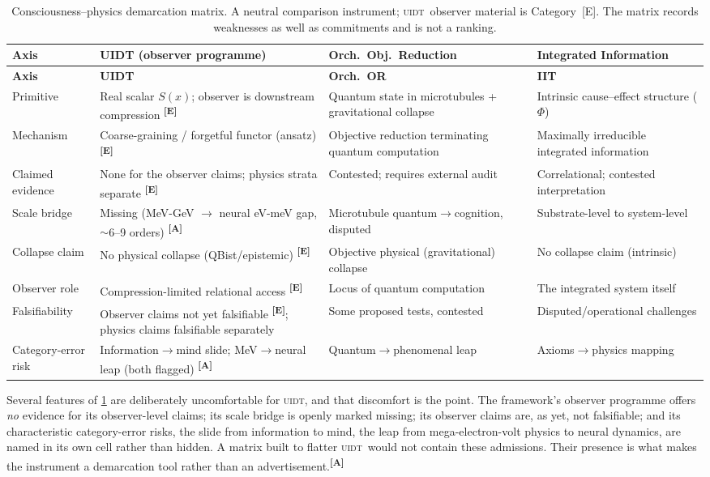 \documentclass[12pt,a4paper,twoside]{article}
\theoremstyle{plain}
\theoremstyle{definition}
\theoremstyle{remark}
\newcommand{\UIDT}{\textsc{uidt}}
\newcommand{\catmark}[1]{\textsuperscript{\textsf{\textbf{[#1]}}}}
\begin{document}
{\small
\renewcommand{\arraystretch}{1.3}
\begin{longtable}{p{} p{} p{} p{}}
\caption{Consciousness--physics demarcation matrix. A neutral comparison
instrument; \UIDT\ observer material is Category~[E]. The matrix records
weaknesses as well as commitments and is not a ranking.}
\label{tab:demarcation-matrix}\\
\toprule
\textbf{Axis} & \textbf{UIDT (observer programme)} & \textbf{Orch.\ Obj.\ Reduction} &
\textbf{Integrated Information} \\
\midrule
\endfirsthead
\toprule
\textbf{Axis} & \textbf{UIDT} & \textbf{Orch.\ OR} & \textbf{IIT} \\
\midrule
\endhead
\bottomrule
\endfoot
Primitive & Real scalar $S(x)$; observer is downstream compression \catmark{E} &
Quantum state in microtubules + gravitational collapse & Intrinsic cause--effect
structure ($\Phi$) \\
Mechanism & Coarse-graining / forgetful functor (ansatz) \catmark{E} &
Objective reduction terminating quantum computation & Maximally irreducible
integrated information \\
Claimed evidence & None for the observer claims; physics strata separate
\catmark{E} & Contested; requires external audit & Correlational; contested
interpretation \\
Scale bridge & Missing (MeV-GeV $\to$ neural eV-meV gap, $\sim$6--9 orders) \catmark{A} &
Microtubule quantum$\to$cognition, disputed & Substrate-level to system-level \\
Collapse claim & No physical collapse (QBist/epistemic) \catmark{E} &
Objective physical (gravitational) collapse & No collapse claim (intrinsic) \\
Observer role & Compression-limited relational access \catmark{E} &
Locus of quantum computation & The integrated system itself \\
Falsifiability & Observer claims not yet falsifiable \catmark{E}; physics claims
falsifiable separately & Some proposed tests, contested & Disputed/operational
challenges \\
Category-error risk & Information$\to$mind slide; MeV$\to$neural leap (both
flagged) \catmark{A} & Quantum$\to$phenomenal leap & Axioms$\to$physics mapping \\
\bottomrule
\end{longtable}
}

\noindent Several features of \cref{tab:demarcation-matrix} are deliberately uncomfortable for \UIDT, and that discomfort is the point. The framework's observer programme offers \emph{no} evidence for its observer-level claims; its scale bridge is openly marked missing; its observer claims are, as yet, not falsifiable; and its characteristic category-error risks, the slide from information to mind, the leap from mega-electron-volt physics to neural dynamics, are named in its own cell rather than hidden. A matrix built to flatter \UIDT\ would not contain these admissions. Their presence is what makes the instrument a demarcation tool rather than an advertisement.\catmark{A}
\end{document}

